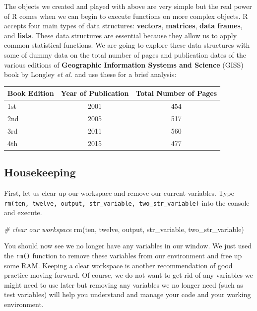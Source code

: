 \documentclass[
]{book}
\newenvironment{Shaded}{\begin{snugshade}}{\end{snugshade}}
\newcommand{\CommentTok}[1]{\textcolor[rgb]{0.56,0.35,0.01}{\textit{#1}}}
\newcommand{\FunctionTok}[1]{\textcolor[rgb]{0.00,0.00,0.00}{#1}}
\newcommand{\NormalTok}[1]{#1}
\begin{document}
The objects we created and played with above are very simple but the real power of R comes when we can begin to execute functions on more complex objects. R accepts four main types of data structures: \textbf{vectors}, \textbf{matrices}, \textbf{data frames}, and \textbf{lists}. These data structures are essential because they allow us to apply common statistical functions.
We are going to explore these data structures with some of dummy data on the total number of pages and publication dates of the various editions of \textbf{Geographic Information Systems and Science} (GISS) book by Longley \emph{et al.} and use these for a brief analysis:

\begin{longtable}[]{@{}lcc@{}}
\toprule()
Book Edition & Year of Publication & Total Number of Pages \\
\midrule()
\endhead
1st & 2001 & 454 \\
2nd & 2005 & 517 \\
3rd & 2011 & 560 \\
4th & 2015 & 477 \\
\bottomrule()
\end{longtable}

\hypertarget{housekeeping}{%
\subsection{Housekeeping}\label{housekeeping}}

First, let us clear up our workspace and remove our current variables. Type \texttt{rm(ten,\ twelve,\ output,\ str\_variable,\ two\_str\_variable)} into the console and execute.

\begin{Shaded}
\begin{Highlighting}[]
\CommentTok{\# clear our workspace}
\FunctionTok{rm}\NormalTok{(ten, twelve, output, str\_variable, two\_str\_variable)}
\end{Highlighting}
\end{Shaded}

You should now see we no longer have any variables in our window. We just used the \texttt{rm()} function to remove these variables from our environment and free up some RAM. Keeping a clear workspace is another recommendation of good practice moving forward. Of course, we do not want to get rid of any variables we might need to use later but removing any variables we no longer need (such as test variables) will help you understand and manage your code and your working environment.
\end{document}
